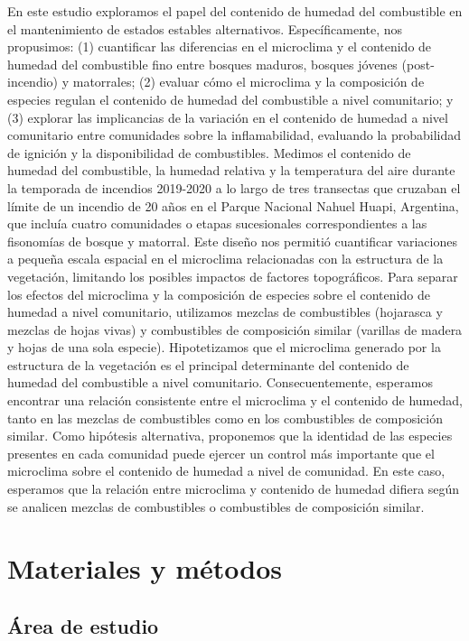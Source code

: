 En este estudio exploramos el papel del contenido de humedad del combustible en el mantenimiento de estados estables alternativos. Específicamente, nos propusimos: (1) cuantificar las diferencias en el microclima y el contenido de humedad del combustible fino entre bosques maduros, bosques jóvenes (post-incendio) y matorrales; (2) evaluar cómo el microclima y la composición de especies regulan el contenido de humedad del combustible a nivel comunitario; y (3) explorar las implicancias de la variación en el contenido de humedad a nivel comunitario entre comunidades sobre la inflamabilidad, evaluando la probabilidad de ignición y la disponibilidad de combustibles. Medimos el contenido de humedad del combustible, la humedad relativa y la temperatura del aire durante la temporada de incendios 2019-2020 a lo largo de tres transectas que cruzaban el límite de un incendio de 20 años en el Parque Nacional Nahuel Huapi, Argentina, que incluía cuatro comunidades o etapas sucesionales correspondientes a las fisonomías de bosque y matorral. Este diseño nos permitió cuantificar variaciones a pequeña escala espacial en el microclima relacionadas con la estructura de la vegetación, limitando los posibles impactos de factores topográficos. Para separar los efectos del microclima y la composición de especies sobre el contenido de humedad a nivel comunitario, utilizamos mezclas de combustibles (hojarasca y mezclas de hojas vivas) y combustibles de composición similar (varillas de madera y hojas de una sola especie). Hipotetizamos que el microclima generado por la estructura de la vegetación es el principal determinante del contenido de humedad del combustible a nivel comunitario. Consecuentemente, esperamos encontrar una relación consistente entre el microclima y el contenido de humedad, tanto en las mezclas de combustibles como en los combustibles de composición similar. Como hipótesis alternativa, proponemos que la identidad de las especies presentes en cada comunidad puede ejercer un control más importante que el microclima sobre el contenido de humedad a nivel de comunidad. En este caso, esperamos que la relación entre microclima y contenido de humedad difiera según se analicen mezclas de combustibles o combustibles de composición similar.

\section{Materiales y métodos}

\subsection{Área de estudio}

